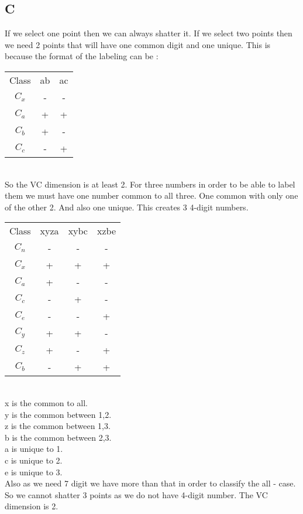 \subsection{C}
If we select one point then we can always shatter it.
If we select two points then we need 2 points that will have one common digit and one unique.
This is because the format of the labeling can be :\\
\begin{tabular}{ c | c | c }
  Class & ab & ac  \\
  $C_x$ & - & - \\
  $C_a$ & + & + \\
  $C_b$ & + & - \\
  $C_c$ & - & + \\
\end{tabular}
\\
So the VC dimension is at least 2.
For three numbers in order to be able to label them we must have one number common
to all three. One common with only one of the other 2. And also one unique. This creates 3 4-digit numbers.\\
\begin{tabular}{ c | c | c | c }
  Class & xyza & xybc & xzbe \\
  $C_n$ & - & - & - \\
  $C_x$ & + & + & + \\
  $C_a$ & + & - & - \\
  $C_c$ & - & + & - \\
  $C_e$ & - & - & + \\
  $C_y$ & + & + & - \\
  $C_z$ & + & - & + \\
  $C_b$ & - & + & + \\
\end{tabular}
\\
x is the common to all. \\
y is the common between 1,2. \\
z is the common between 1,3.\\
b is the common between 2,3.\\
a is unique to 1.\\
c is unique to 2.\\
e is unique to 3.\\

Also as we need 7 digit we have more than that in order to classify the all - case.
So we cannot shatter 3 points as we do not have 4-digit number.
The VC dimension is 2.
